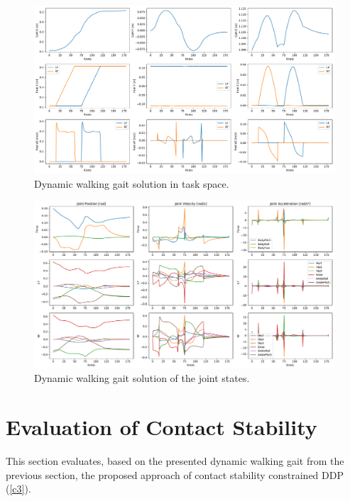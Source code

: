 \begin{figure}[h!]
\centering	
\includegraphics[width=1\textwidth]{fig/walkDynamic/TaskSpace}
\caption{Dynamic walking gait solution in task space.}
\label{fig:walkDynamic_TaskSpace}
\end{figure} 

\begin{figure}[h!]
\centering	
\includegraphics[width=1\textwidth]{fig/walkDynamic/JointState}
\caption{Dynamic walking gait solution of the joint states.}
\label{fig:walkDynamic_JointState}
\end{figure} 



\section{Evaluation of Contact Stability}
This section evaluates, based on the presented dynamic walking gait from the previous section, the proposed approach of contact stability constrained DDP (\cref{c3}).

